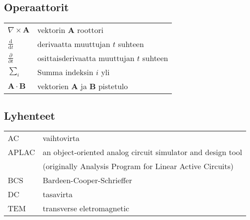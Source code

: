 \documentclass[finnish,12pt,a4paper,pdftex]{article}
\begin{document}
\subsection*{Operaattorit}

\begin{tabular}{ll}
$\nabla \times \mathbf{A}$              & vektorin $\mathbf{A}$ roottori\\
$\displaystyle\frac{\mbox{d}}{\mbox{d} t}$ & derivaatta muuttujan $t$ suhteen\\
[3mm]
$\displaystyle\frac{\partial}{\partial t}$  & osittaisderivaatta muuttujan $t$ suhteen \\[3mm]
$\sum_i $                       & Summa indeksin $i$ yli\\
$\mathbf{A} \cdot \mathbf{B}$    & vektorien $\mathbf{A}$ ja $\mathbf{B}$ pistetulo
\end{tabular}

\subsection*{Lyhenteet}

\begin{tabular}{ll}
AC         & vaihtovirta \\
APLAC      & an object-oriented analog circuit simulator and design tool \\
           & (originally Analysis Program for Linear Active Circuits) \\
BCS        & Bardeen-Cooper-Schrieffer \\ %
DC         & tasavirta \\
TEM        & transverse eletromagnetic
\end{tabular}


\cleardoublepage
\storeinipagenumber
{}
\setcounter{page}{1}
\end{document}
